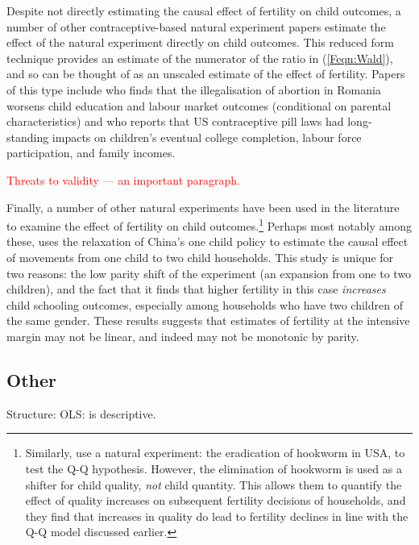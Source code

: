 Despite not directly estimating the causal effect of fertility on child 
outcomes, a number of other contraceptive-based natural experiment papers
estimate the effect of the natural experiment directly on child outcomes.
This reduced form technique provides an estimate of the numerator of the ratio
in (\ref{Feqn:Wald}), and so can be thought of as an unscaled estimate of
the effect of fertility.  Papers of this type include \citet{PopEleches2006} 
who finds that the illegalisation of abortion in Romania worsens child 
education and labour market outcomes (conditional on parental characteristics)
and \citet{Bailey2013} who reports that US contraceptive pill laws had long-%
standing impacts on children's eventual college completion, labour force 
participation, and family incomes.

\textcolor{red}{Threats to validity --- an important paragraph.}

Finally, a number of other natural experiments have been used in the 
literature to examine the effect of fertility on child outcomes.\footnote{
Similarly, \citet{BleakleyLange2009} use a natural experiment: the eradication
of hookworm in USA, to test the Q-Q hypothesis.  However, the elimination of
hookworm is used as a shifter for child quality, \emph{not} child quantity.
This allows them to quantify the effect of quality increases on subsequent
fertility decisions of households, and they find that increases in quality
do lead to fertility declines in line with the Q-Q model discussed earlier.}
Perhaps most notably among these, \citet{Qian2009} uses the relaxation of 
China's one child policy to estimate the causal effect of movements from one 
child to two child households.  This study is unique for two reasons: the low 
parity shift of the experiment (an expansion from one to two children), and the 
fact that it finds that higher fertility in this case \emph{increases} child 
schooling outcomes, especially among households who have two children of the 
same gender. These results suggests that estimates of fertility at the intensive 
margin may not be linear, and indeed may not be monotonic by parity.

\subsection{Other}
Structure: \citet{RosenzweigWolpin1995,RosenzweigSchultz1985,
RosenzweigWolpin1980b}
OLS: \citet{Hanushek1992} is descriptive. \citet{Desai1995}

